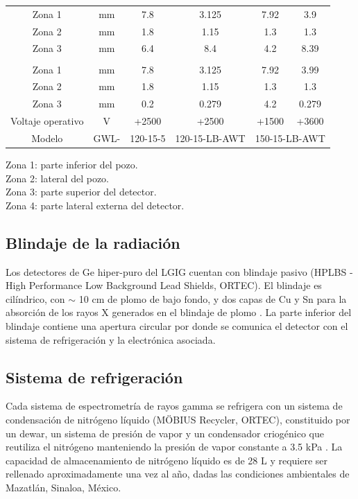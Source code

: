 \begin{table}
\begin{tabular}{|c|c|c|c|c|c|}
\rowcolor{Blue1}	Zona 1	&	mm	&	7.8	&	3.125	&	7.92	&	3.9	\\		
\rowcolor{Blue1}	Zona 2	&	mm	&	1.8	&	1.15	&	1.3	&	1.3	\\		
\rowcolor{Blue1}	Zona 3	&	mm	&	6.4	&	8.4	&	4.2	&	8.39	\\	\hline	\hline
\rowcolor{Blue2}	\multicolumn{2}{|c}{Distancia entre Cu y Ge}			&		&		&		&		\\	\hline	
\rowcolor{Blue1}	Zona 1	&	mm	&	7.8	&	3.125	&	7.92	&	3.99	\\		
\rowcolor{Blue1}	Zona 2	&	mm	&	1.8	&	1.15	&	1.3	&	1.3	\\		
\rowcolor{Blue1}	Zona 3	&	mm	&	0.2	&	0.279	&	4.2	&	0.279	\\	\hline	\hline
\rowcolor{Blue2}	Voltaje operativo	&	V	&	+2500	&	+2500	&	+1500	&	+3600	\\	\hline	\hline
\rowcolor{Blue1} Modelo & GWL- & 120-15-5 & 120-15-LB-AWT & \multicolumn{2}{c|}{150-15-LB-AWT}\\ \hline
\end{tabular}
\begin{flushleft}
Zona 1: parte inferior del pozo. \\
Zona 2: lateral del pozo.  \\
Zona 3: parte superior del detector. \\
Zona 4: parte lateral externa del detector.
\end{flushleft}
\end{table}
		\subsection{Blindaje de la radiación}\label{SubSec-Blindaje}
Los detectores de Ge hiper-puro del LGIG cuentan con blindaje pasivo (HPLBS - High Performance Low Background Lead Shields, ORTEC). El blindaje es cilíndrico, con $\sim$ 10 cm  de plomo de bajo fondo, y dos capas de Cu y Sn para la absorción de los rayos X generados en el blindaje de plomo \cite{OrtecShield}. La parte inferior del blindaje contiene una apertura circular por donde se comunica el detector con el sistema de refrigeración y la electrónica asociada.		
		\subsection{Sistema de refrigeración}\label{SubSec-Refrigeracion}
Cada sistema de espectrometría de rayos gamma se refrigera con un sistema de condensación de nitrógeno líquido (MÖBIUS Recycler, ORTEC), constituido por un dewar, un sistema de presión de vapor y un condensador criogénico que reutiliza el nitrógeno manteniendo la presión de vapor constante a 3.5 kPa \cite{Mobius}. La capacidad de almacenamiento de nitrógeno líquido es de 28 L y requiere ser rellenado aproximadamente una vez al año, dadas las condiciones ambientales de Mazatlán, Sinaloa, México.
